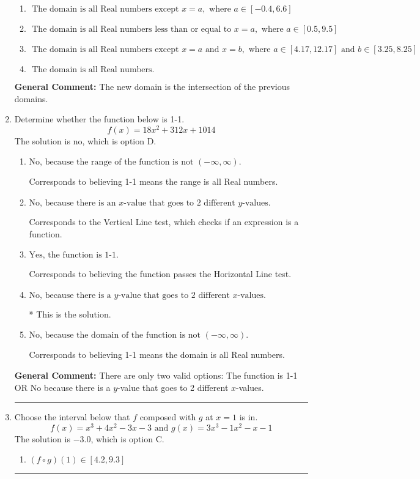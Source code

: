 \documentclass{extbook}[14pt]
\newcommand{\litem}[1]{\item #1

\rule{\textwidth}{0.4pt}}
\begin{document}
\begin{enumerate}
{\begin{enumerate}[label=\Alph*.]
\item \( \text{ The domain is all Real numbers except } x = a, \text{ where } a \in [-0.4, 6.6] \)


\item \( \text{ The domain is all Real numbers less than or equal to } x = a, \text{ where } a \in [0.5, 9.5] \)


\item \( \text{ The domain is all Real numbers except } x = a \text{ and } x = b, \text{ where } a \in [4.17, 12.17] \text{ and } b \in [3.25, 8.25] \)


\item \( \text{ The domain is all Real numbers. } \)


\end{enumerate}

\textbf{General Comment:} The new domain is the intersection of the previous domains.
}
\litem{
Determine whether the function below is 1-1.
\[ f(x) = 18 x^2 + 312 x + 1014 \]The solution is \( \text{no} \), which is option D.\begin{enumerate}[label=\Alph*.]
\item \( \text{No, because the range of the function is not $(-\infty, \infty)$.} \)

Corresponds to believing 1-1 means the range is all Real numbers.
\item \( \text{No, because there is an $x$-value that goes to 2 different $y$-values.} \)

Corresponds to the Vertical Line test, which checks if an expression is a function.
\item \( \text{Yes, the function is 1-1.} \)

Corresponds to believing the function passes the Horizontal Line test.
\item \( \text{No, because there is a $y$-value that goes to 2 different $x$-values.} \)

* This is the solution.
\item \( \text{No, because the domain of the function is not $(-\infty, \infty)$.} \)

Corresponds to believing 1-1 means the domain is all Real numbers.
\end{enumerate}

\textbf{General Comment:} There are only two valid options: The function is 1-1 OR No because there is a $y$-value that goes to 2 different $x$-values.
}
\litem{
Choose the interval below that $f$ composed with $g$ at $x=1$ is in.
\[ f(x) = x^{3} +4 x^{2} -3 x -3 \text{ and } g(x) = 3x^{3} -1 x^{2} -x -1 \]The solution is \( -3.0 \), which is option C.\begin{enumerate}[label=\Alph*.]
\item \( (f \circ g)(1) \in [4.2, 9.3] \)


\end{enumerate}}
\end{enumerate}
\end{document}
